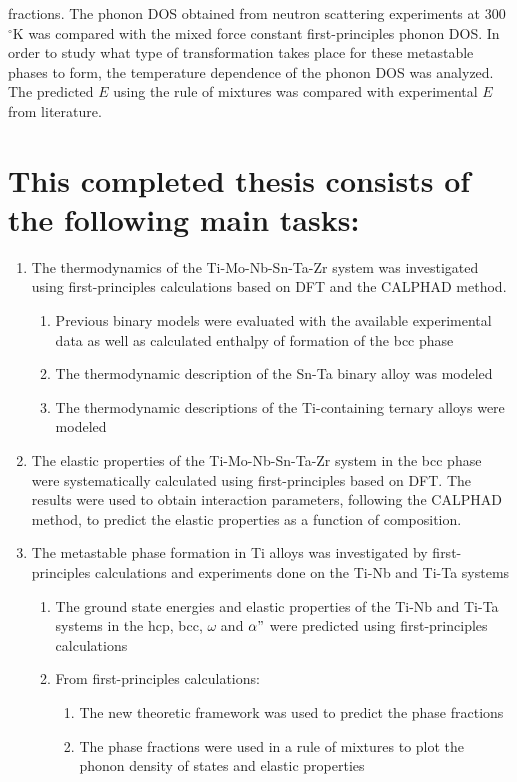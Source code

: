 fractions. The phonon DOS obtained from neutron scattering experiments at 300 $^\circ$K was compared with the mixed force constant first-principles phonon DOS. In order to study what type of transformation takes place for these metastable phases to form, the temperature dependence of the phonon DOS was analyzed. The predicted $E$ using the rule of mixtures was compared with experimental $E$ from literature.


\pagebreak
\section*{This completed thesis consists of the following main tasks:}

\begin{enumerate}
	\item The thermodynamics of the Ti-Mo-Nb-Sn-Ta-Zr system was investigated using first-principles calculations based on DFT and the CALPHAD method. 
	\begin{enumerate}
		\item Previous binary models were evaluated with the available experimental data as well as calculated enthalpy of formation of the bcc phase 
		\item The thermodynamic description of the Sn-Ta binary alloy was modeled
		\item The thermodynamic descriptions of the Ti-containing ternary alloys were modeled
	\end{enumerate}
	\item The elastic properties of the Ti-Mo-Nb-Sn-Ta-Zr system in the bcc phase were systematically calculated using first-principles based on DFT. The results were used to obtain interaction parameters, following the CALPHAD method, to predict the elastic properties as a function of composition. 
	\item The metastable phase formation in Ti alloys was investigated by first-principles calculations and experiments done on the Ti-Nb and Ti-Ta systems
	\begin{enumerate}
		\item The ground state energies and elastic properties of the Ti-Nb and Ti-Ta systems in the hcp, bcc, $\omega$ and $\alpha"$ were predicted using first-principles calculations
		\item From first-principles calculations:
			\begin{enumerate}
			\item The new theoretic framework was used to predict the phase fractions
			\item The phase fractions were used in a rule of mixtures to plot the phonon density of states and elastic properties

\end{enumerate}
\end{enumerate}
\end{enumerate}
